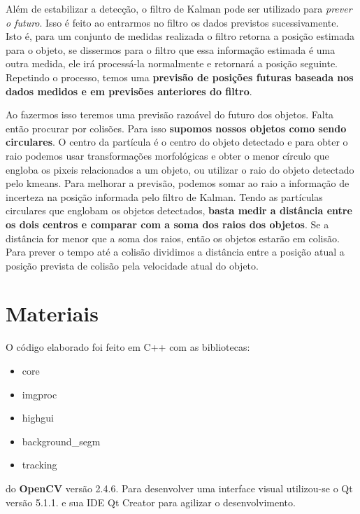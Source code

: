 \documentclass[journal]{IEEEtran}
\begin{document}
Além de estabilizar a detecção, o filtro de Kalman pode ser utilizado 
para \textit{prever o futuro}. Isso é feito ao entrarmos no filtro os 
dados previstos sucessivamente. Isto é, para um conjunto de medidas 
realizada o filtro retorna a posição estimada para o objeto, se 
dissermos para o filtro que essa informação estimada é uma outra 
medida, ele irá processá-la normalmente e retornará a posição 
seguinte. Repetindo o processo, temos uma \textbf{previsão de 
posições 
futuras baseada nos dados medidos e em previsões anteriores do 
filtro}.

Ao fazermos isso teremos uma previsão razoável do futuro dos objetos. 
Falta então procurar por colisões. Para isso \textbf{supomos nossos 
objetos 
como sendo circulares}. O centro da partícula é o centro do objeto 
detectado e para obter o raio podemos usar transformações 
morfológicas e obter o menor círculo que engloba os pixeis 
relacionados a um objeto, ou utilizar o raio do objeto detectado pelo 
kmeans. Para melhorar a previsão, podemos somar ao raio a informação 
de incerteza na posição informada pelo filtro de Kalman. Tendo as 
partículas circulares que englobam os objetos detectados, 
\textbf{basta medir 
a distância entre os dois centros e comparar com a soma dos raios dos 
objetos}. Se a distância for menor que a soma dos raios, então os 
objetos estarão em colisão. Para prever o tempo até a colisão 
dividimos
a distância entre a posição atual a posição prevista de colisão pela
velocidade atual do objeto.




\section{Materiais}
O código elaborado foi feito em C++ com as bibliotecas:
\begin{itemize}
    \item core
    \item imgproc
    \item highgui
    \item background\_segm
    \item tracking
\end{itemize}
do \textbf{OpenCV} versão 2.4.6. Para desenvolver uma interface
visual utilizou-se o Qt versão 5.1.1. e sua IDE Qt Creator para
agilizar o desenvolvimento.
\end{document}

